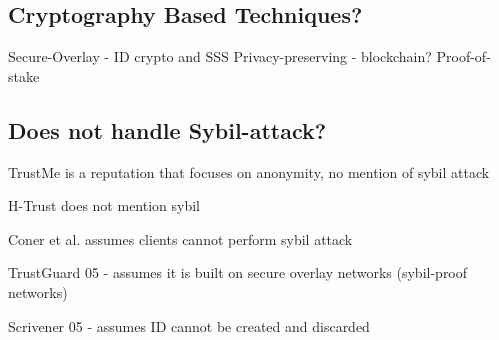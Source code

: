 \subsection{Cryptography Based Techniques?}
Secure-Overlay\cite{lua2007securing} - ID crypto and SSS
Privacy-preserving\cite{schaub2016trustless} - blockchain?
Proof-of-stake\cite{dennis2016rep}

% 
% 
% 
% 
% 


\subsection{Does not handle Sybil-attack?}
TrustMe\cite{singh2003trustme} is a reputation that focuses on anonymity, no mention of sybil attack

H-Trust\cite{zhao2009htrust} does not mention sybil

Coner et al.\cite{conner2009trust} assumes clients cannot perform sybil attack

TrustGuard 05\cite{srivatsa2005trustguard} - assumes it is built on secure overlay networks (sybil-proof networks)

Scrivener 05\cite{nandi2005scrivener} - assumes ID cannot be created and discarded

